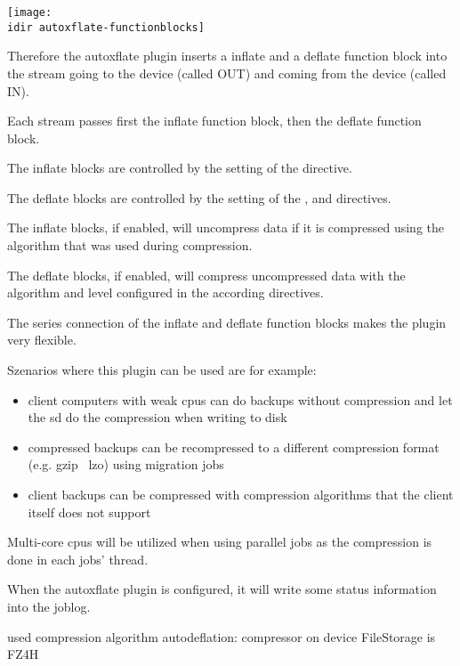 \begin{center}
\texttt{[image: \\idir autoxflate-functionblocks]}
\end{center}

Therefore the autoxflate plugin inserts a inflate and a deflate function block
into the stream going to the device (called OUT) and coming from the device (called IN).

Each stream passes first the inflate function block, then the deflate function block.

The inflate blocks are controlled by the setting of the  directive.

The deflate blocks are controlled by the setting of the ,
 and  directives.

The inflate blocks, if enabled, will uncompress data if it is compressed using the
algorithm that was used during compression.

The deflate blocks, if enabled, will compress uncompressed data with the algorithm and level configured in the according directives.

The series connection of the inflate and deflate function blocks makes the plugin very flexible.

Szenarios where this plugin can be used are for example:
\begin{itemize}
   \item client computers with weak cpus can do backups without compression and let the sd do the compression when writing to disk
    \item compressed backups can be recompressed to a different compression format (e.g. gzip \textrightarrow\ lzo) using migration jobs
    \item client backups can be compressed with compression algorithms that the client itself does not support
\end{itemize}

Multi-core cpus will be utilized when using parallel jobs as the compression is done in each jobs' thread.

When the autoxflate plugin is configured, it will write some status information into the joblog.

\begin{bmessage}{used compression algorithm}
autodeflation: compressor on device FileStorage is FZ4H
\end{bmessage}

